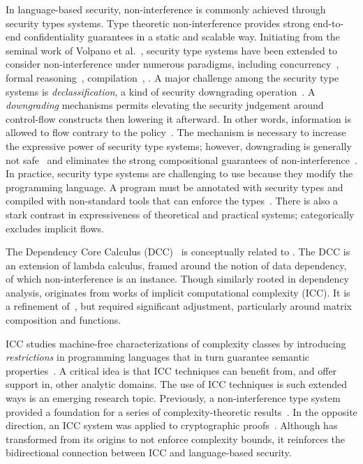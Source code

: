 In language-based security, non-interference is commonly achieved through
security types systems.
Type theoretic non-interference provides strong
end-to-end confidentiality guarantees in a static and scalable way. Initiating
from the seminal work of Volpano et al.~\cite{volpanoI1996}, security type
systems have been extended to consider non-interference under numerous
paradigms, including concurrency~\cite{volpano1998,derakhshan2024,frumin2021},
formal reasoning~\cite{nelson2020,frumin2021}, compilation~\cite{barthe2004},
\etc. A major challenge among the security type systems is
\emph{declassification}, a kind of security downgrading
operation~\cite{cecchetti2017}. A \emph{downgrading} mechanisms permits
elevating the security judgement around control-flow constructs then lowering it
afterward. In other words, information is allowed to flow contrary to the
policy~\cite{cecchetti2017}. The mechanism is necessary to increase the
expressive power of security type systems; however, downgrading is generally not
safe~\cite{derakhshan2024} and eliminates the strong compositional guarantees of
non-interference~\cite{cecchetti2017}. In practice, security type systems are
challenging to use because they modify the programming language. A program must
be annotated with security types and compiled with non-standard tools that can
enforce the types~\cite{lamba2024}. There is also a stark contrast in
expressiveness of theoretical and practical systems; \eg \cite{huang2014}
categorically excludes implicit flows.

The Dependency Core Calculus (DCC)~\cite{abadi1999b} is conceptually related to
\lname. The DCC is an extension of lambda calculus, framed around the notion of
data dependency, of which non-interference is an instance. Though similarly
rooted in dependency analysis, \lname originates from works of implicit
computational complexity (ICC). It is a refinement
of~\cite{moyen20172,aubert20232}, but \lname required significant adjustment,
particularly around matrix composition and functions.

ICC studies machine-free characterizations of complexity classes by introducing
\emph{restrictions} in programming languages that in turn guarantee semantic
properties~\cite{dallago2011}. A critical idea is that ICC techniques can
benefit from, and offer support in, other analytic domains. The use of ICC
techniques is such extended ways is an emerging research topic. Previously, a
non-interference type system provided a foundation for a series of
complexity-theoretic results~\cite{marion2011,hainry2023}. In the opposite
direction, an ICC system was applied to cryptographic proofs~\cite{baillot2019}.
Although \lname has transformed from its origins to not enforce complexity
bounds, it reinforces the bidirectional connection between ICC and
language-based security.

